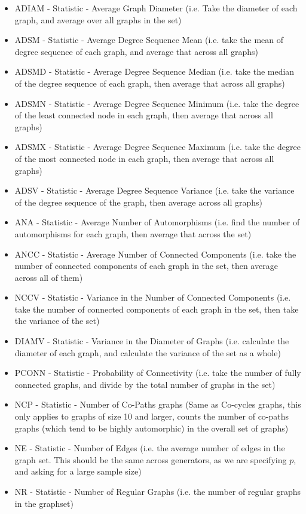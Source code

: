 \documentclass[11pt,a4paper]{report}
\begin{document}
\begin{itemize}
\item{ADIAM - Statistic - Average Graph Diameter (i.e. Take the diameter of each graph, and average over all graphs in the set)}
\item{ADSM - Statistic - Average Degree Sequence Mean (i.e. take the mean of degree sequence of each graph, and average that across all graphs) }
\item{ADSMD - Statistic - Average Degree Sequence Median (i.e. take the median of the degree sequence of each graph, then average that across all graphs) }
\item{ADSMN - Statistic - Average Degree Sequence Minimum (i.e. take the degree of the least connected node in each graph, then average that across all graphs) }
\item{ADSMX - Statistic - Average Degree Sequence Maximum (i.e. take the degree of the most connected node in each graph, then average that across all graphs) }
\item{ADSV - Statistic - Average Degree Sequence Variance (i.e. take the variance of the degree sequence of the graph, then average across all graphs) }
\item{ANA - Statistic - Average Number of Automorphisms (i.e. find the number of automorphisms for each graph, then average that across the set) }
\item{ANCC - Statistic - Average Number of Connected Components (i.e. take the number of connected components of each graph in the set, then average across all of them) }
\item{NCCV - Statistic - Variance in the Number of Connected Components (i.e. take the number of connected components of each graph in the set, then take the variance of the set) }
\item{DIAMV - Statistic - Variance in the Diameter of Graphs (i.e. calculate the diameter of each graph, and calculate the variance of the set as a whole) }
\item{PCONN - Statistic - Probability of Connectivity (i.e. take the number of fully connected graphs, and divide by the total number of graphs in the set)}
\item{NCP - Statistic - Number of Co-Paths graphs (Same as Co-cycles graphs, this only applies to graphs of size 10 and larger, counts the number of co-paths graphs (which tend to be highly automorphic) in the overall set of graphs)}
\item{NE - Statistic - Number of Edges (i.e. the average number of edges in the graph set. This should be the same across generators, as we are specifying $p$, and asking for a large sample size)}
\item{NR - Statistic - Number of Regular Graphs (i.e. the number of regular graphs in the graphset)}
\end{itemize}
\end{document}
